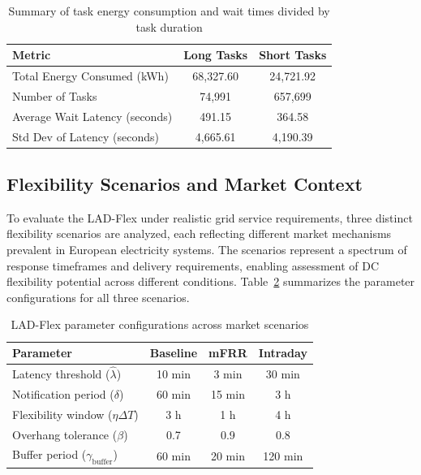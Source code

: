 \documentclass[preprint,12pt]{elsarticle}
\begin{document}
\begin{table}[h!]
\centering
\caption{Summary of task energy consumption and wait times divided by task duration}
\label{tab:task_summary_duration}
\begin{tabular}{lcc}
\toprule
\textbf{Metric} & \textbf{Long Tasks} & \textbf{Short Tasks} \\
\midrule
Total Energy Consumed (kWh)       & 68,327.60   & 24,721.92 \\
Number of Tasks                   & 74,991      & 657,699   \\
Average Wait Latency (seconds)       & 491.15      & 364.58    \\
Std Dev of Latency (seconds)    & 4,665.61    & 4,190.39  \\
\bottomrule
\end{tabular}
\end{table}

\subsection{Flexibility Scenarios and Market Context}\label{Case_study_scenarios}

To evaluate the LAD-Flex under realistic grid service requirements, three distinct flexibility scenarios are analyzed, each reflecting different market mechanisms prevalent in European electricity systems. The scenarios represent a spectrum of response timeframes and delivery requirements, enabling assessment of DC flexibility potential across different conditions. Table~\ref{tab:scenario_parameters} summarizes the parameter configurations for all three scenarios.

\begin{table}[htbp]
\centering
\caption{LAD-Flex parameter configurations across market scenarios}
\label{tab:scenario_parameters}
\begin{tabular}{lccc}
\toprule
\textbf{Parameter} & \textbf{Baseline} & \textbf{mFRR} & \textbf{Intraday} \\
\midrule
Latency threshold ($\hat{\lambda}$) & 10 min & 3 min & 30 min \\
Notification period ($\delta$) & 60 min & 15 min & 3 h \\
Flexibility window ($\eta\Delta T$) & 3 h & 1 h & 4 h \\
Overhang tolerance ($\beta$) & 0.7 & 0.9 & 0.8 \\
Buffer period ($\gamma_{\text{buffer}}$) & 60 min & 20 min & 120 min \\
\bottomrule
\end{tabular}
\end{table}
\end{document}
